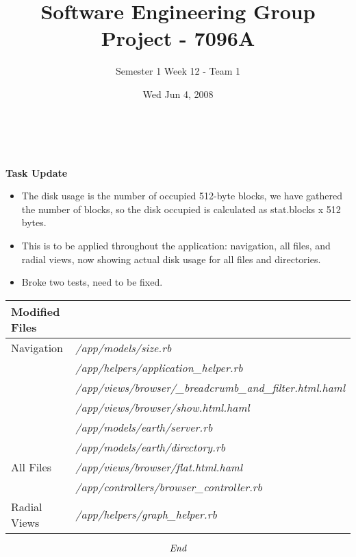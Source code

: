 \documentclass[10pt, a4]{article}
\begin{document}
 
\title{Software Engineering Group Project - 7096A}
\author{Semester 1 Week 12 - Team 1}
\date{Wed Jun 4, 2008}

\maketitle 

\\

\\

\noindent \textbf{Task Update}
\begin{itemize}
\item The disk usage is the number of occupied 512-byte blocks, we have gathered the number of blocks, so the disk occupied is calculated as stat.blocks x 512 bytes.
\item This is to be applied throughout the application: navigation, all files, and radial views, now showing actual disk usage for all files and directories.
\item Broke two tests, need to be fixed. 
\end{itemize}

\begin{table}[ht!]
\begin{tabular}{|p{3cm}|p{8cm}|} \hline
\textbf{Modified Files} & \\ 
\hline
Navigation & \emph{/app/models/size.rb}\\
 & \emph{/app/helpers/application\_helper.rb}\\
 & \emph{/app/views/browser/\_breadcrumb\_and\_filter.html.haml}\\
 & \emph{/app/views/browser/show.html.haml}\\
 & \emph{/app/models/earth/server.rb}\\
 & \emph{/app/models/earth/directory.rb}\\ 
\hline
All Files & \emph{/app/views/browser/flat.html.haml}\\
 & \emph{/app/controllers/browser\_controller.rb} \\ 
\hline
Radial Views & \emph{/app/helpers/graph\_helper.rb}\\
\hline
\end{tabular}
\end{table}


\[\emph{End}\]
 
\end{document}
